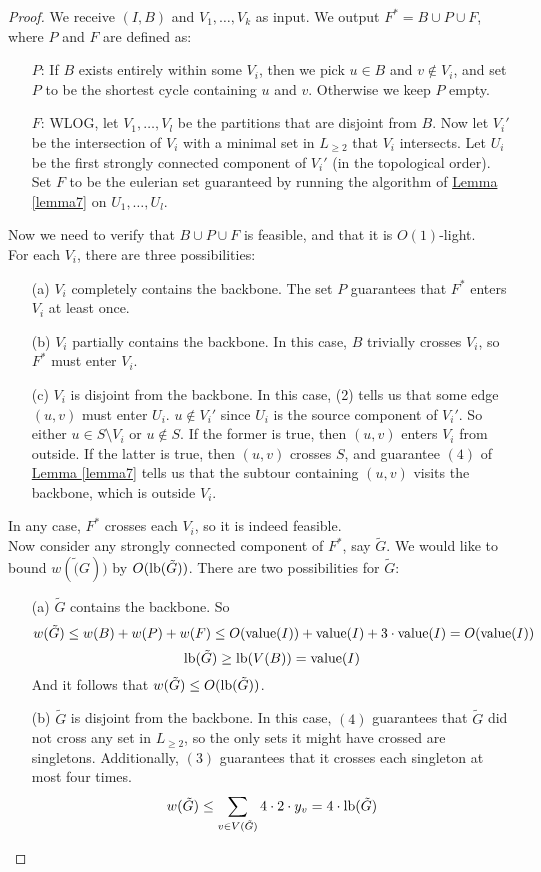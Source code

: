 \documentclass[./main.tex]{subfiles}
\begin{document}
	\begin{proof}
		We receive $(I,B)$ and $V_1,\ldots,V_k$ as input. We output $F^*=B\cup P\cup F$, where $P$ and $F$ are defined as:
		\begin{enumerate}
			\item[$P$:] If $B$ exists entirely within some $V_i$, then we pick $u\in B$ and $v\notin V_i$, and set $P$ to be the shortest cycle containing $u$ and $v$. Otherwise we keep $P$ empty.
			\item[$F$:] WLOG, let $V_1,\ldots,V_l$ be the partitions that are disjoint from $B$. Now let $V_i'$ be the intersection of $V_i$ with a minimal set in $L_{\geq 2}$ that $V_i$ intersects. Let $U_i$ be the first strongly connected component of $V_i'$ (in the topological order). Set $F$ to be the eulerian set guaranteed by running the algorithm of \hyperref[lemma7]{Lemma \ref{lemma7}} on $U_1,\ldots,U_l$.
		\end{enumerate}\vspace{2mm}
		Now we need to verify that $B\cup P\cup F$ is feasible, and that it is $O(1)$-light.
		\\For each $V_i$, there are three possibilities:
		\begin{enumerate}
			\item[(a)] $V_i$ completely contains the backbone. The set $P$ guarantees that $F^*$ enters $V_i$ at least once.
			\item[(b)] $V_i$ partially contains the backbone. In this case, $B$ trivially crosses $V_i$, so $F^*$ must enter $V_i$.
			\item[(c)] $V_i$ is disjoint from the backbone. In this case, (2) tells us that some edge $(u,v)$ must enter $U_i$. $u\notin V_i'$ since $U_i$ is the source component of $V_i'$. So either $u\in S\setminus V_i$ or $u\notin S$. If the former is true, then $(u,v)$ enters $V_i$ from outside. If the latter is true, then $(u,v)$ crosses $S$, and guarantee $(4)$ of \hyperref[lemma7]{Lemma \ref{lemma7}} tells us that the subtour containing $(u,v)$ visits the backbone, which is outside $V_i$.
		\end{enumerate}
		In any case, $F^*$ crosses each $V_i$, so it is indeed feasible.\vspace{2mm}
		\\Now consider any strongly connected component of $F^*$, say $\tilde{G}$. We would like to bound $w(\tilde(G))$ by $O(\textup{lb}(\tilde{G}))$. There are two possibilities for $\tilde{G}$:
		\begin{enumerate}
			\item[(a)] $\tilde{G}$ contains the backbone. So $$w(\tilde{G})\leq w(B) + w(P) + w(F)\leq O(\textup{value}(I)) + \textup{value}(I) + 3\cdot\textup{value}(I) = O(\textup{value}(I))$$
			      $$\textup{lb}(\tilde{G})\geq \textup{lb}(V(B)) = \textup{value}(I)$$
			      And it follows that $w(\tilde{G})\leq O(\textup{lb}(\tilde{G}))$.
			\item[(b)] $\tilde{G}$ is disjoint from the backbone. In this case, $(4)$ guarantees that $\tilde{G}$ did not cross any set in $L_{\geq 2}$, so the only sets it might have crossed are singletons. Additionally, $(3)$ guarantees that it crosses each singleton at most four times. $$w(\tilde{G})\leq \sum_{v\in V(\tilde{G})}4\cdot 2\cdot y_v = 4\cdot\textup{lb}(\tilde{G})$$
		\end{enumerate}
	\end{proof}
\end{document}

